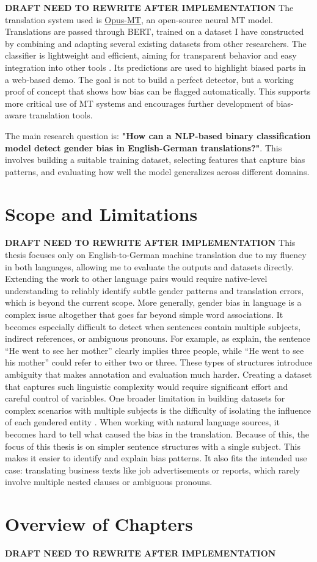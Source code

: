 \textbf{DRAFT NEED TO REWRITE AFTER IMPLEMENTATION}
The translation system used is \href{https://github.com/Helsinki-NLP/Opus-MT?tab=readme-ov-file}{Opus-MT}, an open-source neural MT model. %
Translations are passed through BERT, trained on a dataset I have constructed by combining and adapting several existing datasets from other researchers. The classifier is lightweight and efficient, aiming for transparent behavior and easy integration into other tools \citep{devlinBERTPretrainingDeep2019}. Its predictions are used to highlight biased parts in a web-based demo. The goal is not to build a perfect detector, but a working proof of concept that shows how bias can be flagged automatically. This supports more critical use of MT systems and encourages further development of bias-aware translation tools.

The main research question is: \textbf{"How can a NLP-based binary classification model detect gender bias in English-German translations?"}. This involves building a suitable training dataset, selecting features that capture bias patterns, and evaluating how well the model generalizes across different domains.

\section{Scope and Limitations}

\textbf{DRAFT NEED TO REWRITE AFTER IMPLEMENTATION}
This thesis focuses only on English-to-German machine translation due to my fluency in both languages, allowing me to evaluate the outputs and datasets directly. Extending the work to other language pairs would require native-level understanding to reliably identify subtle gender patterns and translation errors, which is beyond the current scope. More generally, gender bias in language is a complex issue altogether that goes far beyond simple word associations. It becomes especially difficult to detect when sentences contain multiple subjects, indirect references, or ambiguous pronouns. For example, as \citet{barclayInvestigatingMarkersDrivers2024a} explain, the sentence “He went to see her mother” clearly implies three people, while “He went to see his mother” could refer to either two or three. These types of structures introduce ambiguity that makes annotation and evaluation much harder. Creating a dataset that captures such linguistic complexity would require significant effort and careful control of variables. One broader limitation in building datasets for complex scenarios with multiple subjects is the difficulty of isolating the influence of each gendered entity \citep{lardelliBuildingBridgesDataset2024}. When working with natural language sources, it becomes hard to tell what caused the bias in the translation. Because of this, the focus of this thesis is on simpler sentence structures with a single subject. This makes it easier to identify and explain bias patterns. It also fits the intended use case: translating business texts like job advertisements or reports, which rarely involve multiple nested clauses or ambiguous pronouns.
 
\section{Overview of Chapters}
\textbf{DRAFT NEED TO REWRITE AFTER IMPLEMENTATION}
